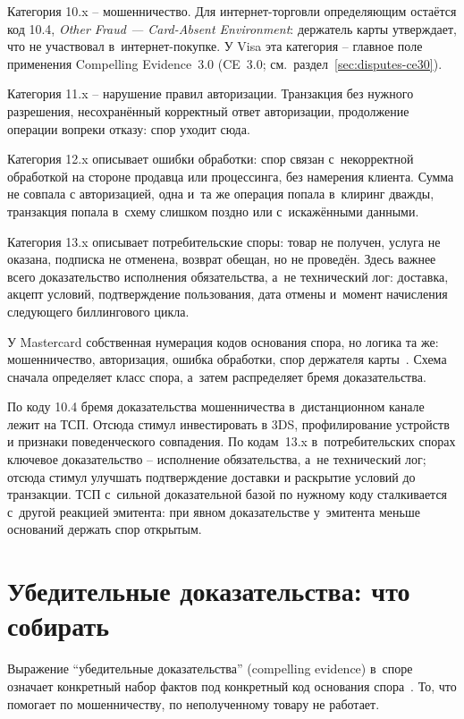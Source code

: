 Категория 10.x -- мошенничество. Для интернет-торговли определяющим остаётся
код 10.4, \textit{Other Fraud --- Card-Absent Environment}:
держатель карты утверждает, что не участвовал в~интернет-покупке.
У Visa эта категория -- главное поле применения Compelling Evidence~3.0
(CE~3.0; см.~раздел~\ref{sec:disputes-ce30}).

Категория 11.x -- нарушение правил авторизации.
Транзакция без нужного разрешения, несохранённый корректный ответ
авторизации, продолжение операции вопреки отказу: спор уходит сюда.

Категория 12.x описывает ошибки обработки: спор связан
с~некорректной обработкой на стороне продавца или процессинга,
без намерения клиента. Сумма не совпала с
авторизацией, одна и~та же операция попала в~клиринг дважды, транзакция
попала в~схему слишком поздно или с~искажёнными данными.

Категория 13.x описывает потребительские споры: товар не получен, услуга
не оказана, подписка не отменена, возврат обещан, но не проведён.
Здесь важнее всего доказательство исполнения обязательства,
а~не технический лог: доставка, акцепт условий, подтверждение пользования,
дата отмены и~момент начисления следующего биллингового цикла.

У Mastercard собственная нумерация кодов основания спора, но логика
та же: мошенничество, авторизация, ошибка обработки, спор держателя
карты~\cite{mc-chargeback-guide}. Схема сначала определяет класс спора, а~затем
распределяет бремя доказательства.

По коду 10.4 бремя доказательства мошенничества в~дистанционном
канале лежит на ТСП. Отсюда стимул инвестировать в 3DS, профилирование устройств
и признаки поведенческого совпадения. По кодам~13.x в~потребительских
спорах ключевое доказательство -- исполнение обязательства, а~не
технический лог; отсюда стимул улучшать подтверждение доставки
и раскрытие условий до транзакции. ТСП с~сильной доказательной
базой по нужному коду сталкивается с~другой реакцией эмитента: при явном
доказательстве у~эмитента меньше оснований держать спор открытым.

\section{Убедительные доказательства: что собирать}\label{sec:disputes-evidence}

Выражение \enquote{убедительные доказательства} (compelling evidence)
в~споре означает конкретный набор
фактов под конкретный код основания спора~\cite{visa-core-rules}.
То, что помогает по мошенничеству, по неполученному товару не работает.

